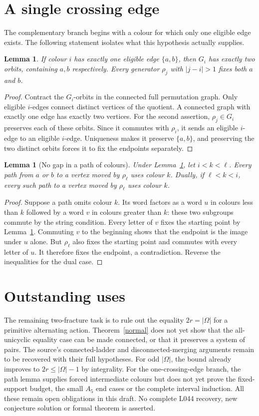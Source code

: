 \documentclass[11pt,a4paper]{article}
\newtheorem{lemma}[theorem]{Lemma}
\begin{document}
\section*{A single crossing edge}
The complementary branch begins with a colour for which only one
eligible edge exists. The following statement isolates what this
hypothesis actually supplies.
\begin{lemma}\label{single}
If colour $i$ has exactly one eligible edge $\{a,b\}$, then $G_i$ has
exactly two orbits, containing $a,b$ respectively. Every generator
$\rho_j$ with $|j-i|>1$ fixes both $a$ and $b$.
\end{lemma}
\begin{proof}
Contract the $G_i$-orbits in the connected full permutation graph.
Only eligible $i$-edges connect distinct vertices of the quotient. A
connected graph with exactly one edge has exactly two vertices.
For the second assertion, $\rho_j\in G_i$ preserves each of these
orbits. Since it commutes with $\rho_i$, it sends an eligible $i$-edge
to an eligible $i$-edge. Uniqueness makes it preserve $\{a,b\}$, and
preserving the two distinct orbits forces it to fix the endpoints
separately.
\end{proof}

\begin{lemma}[No gap in a path of colours]\label{gap}
Under Lemma~\ref{single}, let $i<k<\ell$. Every path from $a$ or $b$
to a vertex moved by $\rho_\ell$ uses colour $k$. Dually, if
$\ell<k<i$, every such path to a vertex moved by $\rho_\ell$ uses
colour $k$.
\end{lemma}
\begin{proof}
Suppose a path omits colour $k$. Its word factors as a word $u$ in
colours less than $k$ followed by a word $v$ in colours greater than
$k$: these two subgroups commute by the string condition. Every
letter of $v$ fixes the starting point by Lemma~\ref{single}.
Commuting $v$ to the beginning shows that the endpoint is the image
under $u$ alone. But $\rho_\ell$ also fixes the starting point and
commutes with every letter of $u$. It therefore fixes the endpoint,
a contradiction. Reverse the inequalities for the dual case.
\end{proof}

\section*{Outstanding uses}
The remaining two-fracture task is to rule out the equality
$2r=|\Omega|$ for a primitive alternating action. Theorem~\ref{normal}
does not yet show that the all-unicyclic equality case can be made
connected, or that it preserves a system of pairs. The source's
connected-ladder and disconnected-merging arguments remain to be
recovered with their full hypotheses. For odd $|\Omega|$, the bound
already improves to $2r\leq |\Omega|-1$ by integrality.
For the one-crossing-edge branch, the path lemma supplies forced
intermediate colours but does not yet prove the fixed-support budget,
the small $A_5$ end cases or the complete interval induction.
All these remain open obligations in this draft. No complete L044
recovery, new conjecture solution or formal theorem is asserted.
\end{document}
